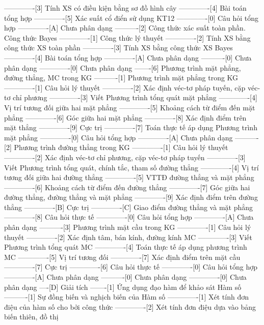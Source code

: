 -------------[3] Tính XS có điều kiện bằng sơ đồ hình cây
-------------[4] Bài toán tổng hợp
-------------[5] Xác suất cổ điển sử dụng KT12
-------------[0] Câu hỏi tổng hợp
-------------[A] Chưa phân dạng
----------[2] Công thức xác suất toàn phần. Công thức Bayes
-------------[1] Công thức lý thuyết
-------------[2] Tính XS bằng công thức XS toàn phần
-------------[3] Tính XS bằng công thức XS Bayes
-------------[4] Bài toán tổng hợp
-------------[A] Chưa phân dạng
----------[0] Chưa phân dạng
-------------[0] Chưa phân dạng
-------[6] Phương trình mặt phẳng, đường thẳng, MC trong KG 
----------[1] Phương trình mặt phẳng trong KG
-------------[1] Câu hỏi lý thuyết
-------------[2] Xác định véc-tơ pháp tuyến, cặp véc-tơ chỉ phương
-------------[3] Viết Phương trình tổng quát mặt phẳng
-------------[4] Vị trí tương đối giữa hai mặt phẳng
-------------[5] Khoảng cách từ điểm đến mặt phẳng
-------------[6] Góc giữa hai mặt phẳng
-------------[8] Xác định điểm trên mặt thẳng
-------------[9] Cực trị
-------------[7] Toán thực tế áp dụng Phương trình mặt phẳng
-------------[0] Câu hỏi tổng hợp
-------------[A] Chưa phân dạng
----------[2] Phương trình đường thẳng trong KG
-------------[1] Câu hỏi lý thuyết
-------------[2] Xác định véc-tơ chỉ phương, cặp véc-tơ pháp tuyến
-------------[3] Viết Phương trình tổng quát, chính tắc, tham số đường thẳng
-------------[4] Vị trí tương đối giữa hai đường thẳng
-------------[5] VTTĐ đường thẳng và mặt phẳng
-------------[6] Khoảng cách từ điểm đến đường thẳng
-------------[7] Góc giữa hai đường thẳng, đường thẳng và mặt phẳng
-------------[9] Xác định điểm trên đường thẳng
-------------[B] Cực trị
-------------[C] Giao điểm đường thẳng và mặt phẳng
-------------[8] Câu hỏi thực tế
-------------[0] Câu hỏi tổng hợp
-------------[A] Chưa phân dạng
----------[3] Phương trình mặt cầu trong KG
-------------[1] Câu hỏi lý thuyết
-------------[2] Xác định tâm, bán kính, đường kính MC
-------------[3] Viết Phương trình tổng quát MC
-------------[4] Toán thực tế áp dụng phương trình MC
-------------[5] Vị trí tương đối
-------------[7] Xác định điểm trên mặt cầu
-------------[7] Cực trị
-------------[6] Câu hỏi thực tế
-------------[0] Câu hỏi tổng hợp
-------------[A] Chưa phân dạng
----------[0] Chưa phân dạng
-------------[0] Chưa phân dạng
----[D] Giải tích
-------[1] Ứng dụng đạo hàm để khảo sát Hàm số
----------[1] Sự đồng biến và nghịch biến của Hàm số
-------------[1] Xét tính đơn điệu của hàm số cho bởi công thức
-------------[2] Xét tính đơn điệu dựa vào bảng biến thiên, đồ thị
